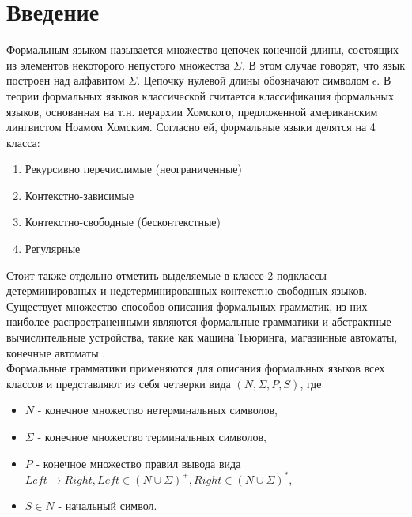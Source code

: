 \chapter{Введение}
\label{chapt_intro}
Формальным языком называется множество цепочек конечной длины, состоящих из элементов некоторого непустого множества $\Sigma$. В этом случае говорят, что язык построен над алфавитом $\Sigma$. Цепочку нулевой длины обозначают символом $\epsilon$. В теории формальных языков классической считается классификация формальных языков, основанная на т.н. иерархии Хомского, предложенной американским лингвистом Ноамом Хомским. Согласно ей, формальные языки делятся на 4 класса:
\begin{enumerate}[start=0]
	\item Рекурсивно перечислимые (неограниченные)
	\item Контекстно-зависимые
	\item Контекстно-свободные (бесконтекстные)
	\item Регулярные
\end{enumerate}
Стоит также отдельно отметить выделяемые в классе 2 подклассы детерминированых и недетерминированных контекстно-свободных языков.\\
Существует множество способов описания формальных грамматик, из них наиболее распространенными являются формальные грамматики и абстрактные вычислительные устройства, такие как машина Тьюринга, магазинные автоматы, конечные автоматы .
\\
Формальные грамматики применяются для описания формальных языков всех классов и представляют из себя четверки вида $(N,\Sigma,P,S)$, где
\begin{itemize}
	\item $N$ - конечное множество нетерминальных символов,
	\item $\Sigma$ - конечное множество терминальных символов,
	\item $P$ - конечное множество правил вывода вида $Left \rightarrow Right, Left \in (N \cup \Sigma)^+, Right \in (N \cup \Sigma)^*$,
	\item $S \in N$ - начальный символ.
\end{itemize}  
\clearpage